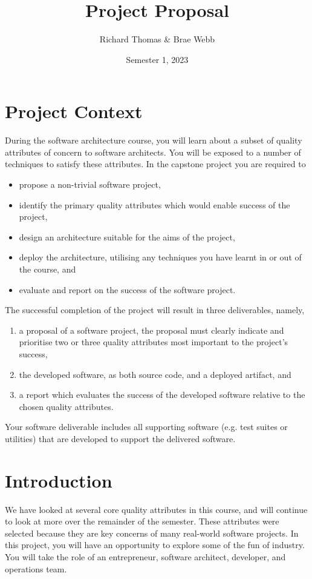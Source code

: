 \documentclass{csse4400}
\title{Project Proposal}
\author{Richard Thomas \& Brae Webb}
\date{Semester 1, 2023}
\begin{document}
\maketitle

\section*{Project Context}
During the software architecture course,
you will learn about a subset of quality attributes of concern to software architects.
You will be exposed to a number of techniques to satisfy these attributes.
In the capstone project you are required to
\begin{itemize}
    \item propose a non-trivial software project,
    \item identify the primary quality attributes which would enable success of the project,
    \item design an architecture suitable for the aims of the project,
    \item deploy the architecture, utilising any techniques you have learnt in or out of the course, and
    \item evaluate and report on the success of the software project.
\end{itemize}

\noindent
The successful completion of the project will result in three deliverables, namely,
\begin{enumerate}[label=\roman*]
    \item a proposal of a software project, the proposal must clearly indicate and prioritise two or three quality attributes most important to the project's success,
    \item the developed software,	 as both source code, and a deployed artifact, and
    \item a report which evaluates the success of the developed software relative to the chosen quality attributes.
\end{enumerate}

\noindent
Your software deliverable includes all supporting software (e.g. test suites or utilities) that are developed to support the delivered software.

\section{Introduction}
We have looked at several core quality attributes in this course, and will continue to look at more over the remainder of the semester.
These attributes were selected because they are key concerns of many real-world software projects.
In this project, you will have an opportunity to explore some of the fun of industry.
You will take the role of an entrepreneur, software architect, developer, and operations team.
\end{document}
